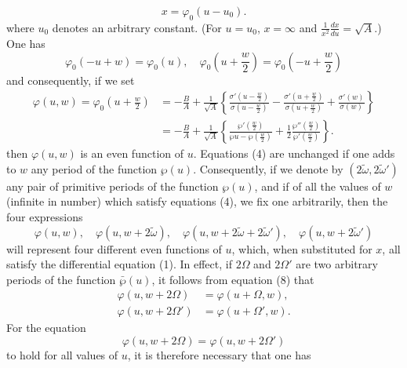 \documentclass{article}
\begin{document}
\begin{equation}
x = \varphi_0(u - u_0).
\end{equation}
where $u_0$ denotes an arbitrary constant. (For $u = u_0$, $x = \infty$ and $\frac{1}{x^2}\frac{dx}{du} = \sqrt{A}$.) One has
\begin{equation}
\varphi_0(-u + w) = \varphi_0(u), \quad \varphi_0\left(u + \frac{w}{2}\right) = \varphi_0\left(-u + \frac{w}{2}\right)
\end{equation}
and consequently, if we set
\begin{equation}
\begin{aligned}
\varphi(u, w) = \varphi_0\left(u + \frac{w}{2}\right) &= -\frac{B}{A} + \frac{1}{\sqrt{A}}\left\{\frac{\sigma'\left(u - \frac{w}{2}\right)}{\sigma\left(u - \frac{w}{2}\right)} - \frac{\sigma'\left(u + \frac{w}{2}\right)}{\sigma\left(u + \frac{w}{2}\right)} + \frac{\sigma'(w)}{\sigma(w)}\right\} \\
&= -\frac{B}{A} + \frac{1}{\sqrt{A}}\left\{\frac{\wp'\left(\frac{w}{2}\right)}{\wp u - \wp\left(\frac{w}{2}\right)} + \frac{1}{2}\frac{\wp''\left(\frac{w}{2}\right)}{\wp'\left(\frac{w}{2}\right)}\right\}.
\end{aligned}
\end{equation}
then $\varphi(u, w)$ is an even function of $u$.
Equations (4) are unchanged if one adds to $w$ any period of the function $\wp(u)$. 
Consequently, if we denote by $(2\tilde{\omega}, 2\tilde{\omega}')$ any pair of primitive periods of the function $\wp(u)$, and if of all the values of $w$ (infinite in number) which satisfy equations (4), we fix one arbitrarily, then the four expressions
\[
\varphi(u, w), \quad \varphi(u, w + 2\tilde{\omega}), \quad \varphi(u, w + 2\tilde{\omega} + 2\tilde{\omega}'), \quad \varphi(u, w + 2\tilde{\omega}')
\]
will represent four different even functions of $u$, which, when substituted for $x$, all satisfy the differential equation (1). 
In effect, if $2\Omega$ and $2\Omega'$ are two arbitrary periods of the function $\bar{\wp}(u)$, it follows from equation (8) that
\begin{equation}
\begin{aligned}
\varphi(u, w + 2\Omega) &= \varphi(u + \Omega, w), \\
\varphi(u, w + 2\Omega') &= \varphi(u + \Omega', w).
\end{aligned}
\end{equation}
For the equation
\[
\varphi(u, w + 2\Omega) = \varphi(u, w + 2\Omega')
\]
to hold for all values of $u$, it is therefore necessary that one has
\end{document}
